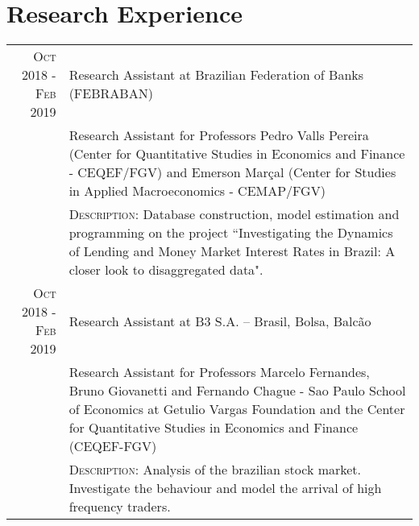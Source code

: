 \documentclass[a4paper,10pt]{article}
\begin{document}

\section{Research Experience}
\begin{tabular}{r|p{10.75cm}}
\textsc{Oct 2018 - Feb 2019} & Research Assistant at Brazilian Federation of Banks (FEBRABAN) \\
&\footnotesize{Research Assistant for Professors Pedro Valls Pereira (Center for Quantitative Studies in Economics and Finance - CEQEF/FGV) and Emerson Marçal (Center for Studies in Applied Macroeconomics - CEMAP/FGV)}\\
&\footnotesize{\textsc{Description}: Database construction, model estimation and programming on the project ``Investigating the Dynamics of Lending and Money Market Interest Rates in Brazil: A closer look to disaggregated data".} \\
\textsc{Oct 2018 - Feb 2019} & Research Assistant at B3 S.A. – Brasil, Bolsa, Balcão \\
&\footnotesize{Research Assistant for Professors Marcelo Fernandes, Bruno Giovanetti and Fernando Chague - Sao Paulo School of Economics at Getulio Vargas Foundation and the Center for Quantitative Studies in Economics and Finance (CEQEF-FGV)} \\
&\footnotesize{\textsc{Description}: Analysis of the brazilian stock market. Investigate the behaviour and model the arrival of high frequency traders.} 
\end{tabular}

\end{document}
